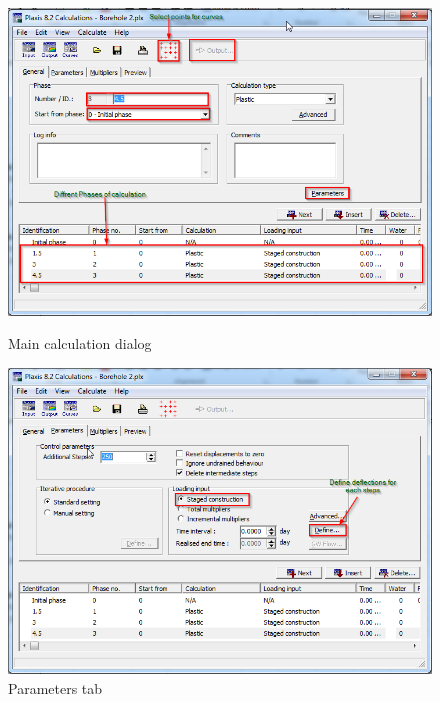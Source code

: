 \begin{figure}[hbtp]
  \vfill
  \centering
  \includegraphics[height=0.4\textheight]{images/plx/a (13).png}
  \caption{Main calculation dialog}
  \vfill
  \includegraphics[height=0.4\textheight]{images/plx/a (14).png}
  \caption{Parameters tab}
  \vfill
\end{figure}
\break
